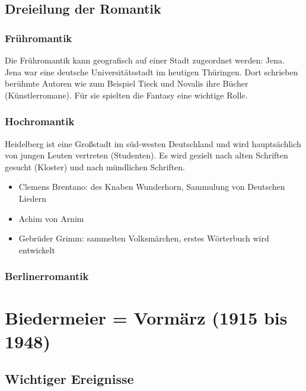 \documentclass[12pt,a4paper]{article}
\begin{document}
\subsection{Dreieilung der Romantik}

\subsubsection{Frühromantik}

Die Frühromantik kann geografisch auf einer Stadt zugeordnet werden: Jena. Jena war eine deutsche Universitätsstadt im heutigen Thüringen. Dort schrieben berühmte Autoren wie zum Beispiel Tieck und Novalis ihre Bücher (Künstlerromane). Für sie spielten die Fantasy eine wichtige Rolle.

\subsubsection{Hochromantik}

Heidelberg ist eine Großstadt im süd-westen Deutschland und wird hauptsächlich von jungen Leuten vertreten (Studenten). Es wird gezielt nach alten Schriften gesucht (Kloster) und nach mündlichen Schriften.

\begin{itemize}
\item Clemens Brentano: des Knaben Wunderhorn, Sammulung von Deutschen Liedern
\item Achim von Arnim
\item Gebrüder Grimm: sammelten Volksmärchen, erstes Wörterbuch wird entwickelt
\end{itemize}

\subsubsection{Berlinerromantik}

\newpage

\section{Biedermeier = Vormärz (1915 bis 1948)}

\subsection{Wichtiger Ereignisse}
\end{document}

